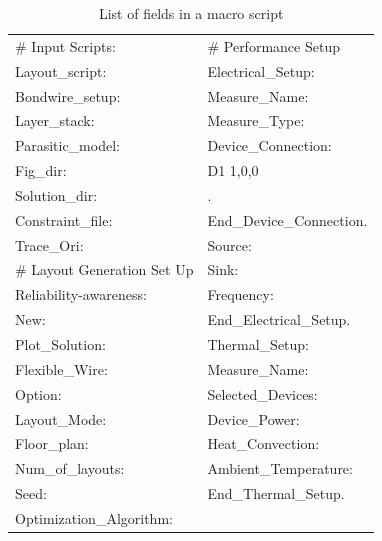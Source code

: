 \documentclass[11pt]{article}
\newcommand{\bigstrut}[1][]{}
\begin{document}
    
    \begin{table}[t]
  \centering
  \caption{List of fields in a macro script}
  \begin{tabular}{|l|r}
    \hline
    \# Input Scripts: & \multicolumn{1}{l|}{\# Performance Setup } \bigstrut[t]\\
    Layout\_script: & \multicolumn{1}{l|}{Electrical\_Setup:} \\
    Bondwire\_setup: & \multicolumn{1}{l|}{Measure\_Name:} \\
    Layer\_stack: & \multicolumn{1}{l|}{Measure\_Type:} \\
    Parasitic\_model: & \multicolumn{1}{l|}{Device\_Connection:} \\
    Fig\_dir: & \multicolumn{1}{l|}{D1 1,0,0} \\
    Solution\_dir: & \multicolumn{1}{l|}{.} \\
    Constraint\_file: & \multicolumn{1}{l|}{End\_Device\_Connection.} \\
    Trace\_Ori: & \multicolumn{1}{l|}{Source:} \bigstrut[b]\\
\cline{1-1}    \# Layout Generation Set Up & \multicolumn{1}{l|}{Sink:} \bigstrut[t]\\
    Reliability-awareness: & \multicolumn{1}{l|}{Frequency:} \\
    New:  & \multicolumn{1}{l|}{End\_Electrical\_Setup.} \bigstrut[b]\\
\cline{2-2}    Plot\_Solution: & \multicolumn{1}{l|}{Thermal\_Setup:} \bigstrut[t]\\
    Flexible\_Wire: & \multicolumn{1}{l|}{Measure\_Name:} \\
    Option: & \multicolumn{1}{l|}{Selected\_Devices:} \\
    Layout\_Mode: & \multicolumn{1}{l|}{Device\_Power:} \\
    Floor\_plan: & \multicolumn{1}{l|}{Heat\_Convection:} \\
    Num\_of\_layouts: & \multicolumn{1}{l|}{Ambient\_Temperature:} \\
    Seed: & \multicolumn{1}{l|}{End\_Thermal\_Setup.} \bigstrut[b]\\
\cline{2-2}    Optimization\_Algorithm: &  \bigstrut\\
\cline{1-1}   

  
   
    \end{tabular}%
  \label{macro_content}%
\end{table}%


\pagebreak
\end{document}
